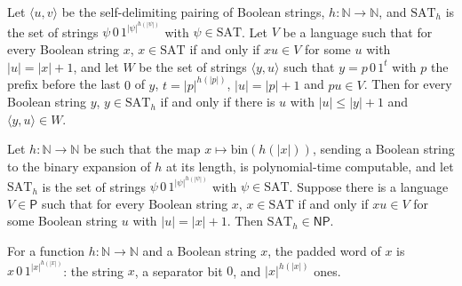 \begin{theorem}
\label{Complexity.ladner_verifier_equiv}
\leanok
{}
Let $\langle u,v\rangle$ be the self-delimiting pairing of Boolean strings, $h:\mathbb N\to\mathbb N$,
and $\mathrm{SAT}_h$ is the set of strings $\psi\,0\,1^{|\psi|^{h(|\psi|)}}$ with $\psi\in\mathrm{SAT}$. Let $V$ be a language such that for every Boolean string $x$, $x\in\mathrm{SAT}$ if and
only if $xu\in V$ for some $u$ with $|u|=|x|+1$, and let $W$ be the set of strings
$\langle y,u\rangle$ such that $y=p\,0\,1^t$ with $p$ the prefix before the last $0$ of $y$,
$t=|p|^{h(|p|)}$, $|u|=|p|+1$ and $pu\in V$. Then for every Boolean string $y$,
$y\in\mathrm{SAT}_h$ if and only if there is $u$ with $|u|\le|y|+1$ and $\langle y,u\rangle\in W$.
\end{theorem}

\begin{theorem}
\label{Complexity.ladner_padded_NP}
\leanok
{}
Let $h:\mathbb N\to\mathbb N$ be such that the map $x\mapsto\mathrm{bin}(h(|x|))$, sending a Boolean
string to the binary expansion of $h$ at its length, is polynomial-time computable, and let
$\mathrm{SAT}_h$ is the set of strings $\psi\,0\,1^{|\psi|^{h(|\psi|)}}$ with $\psi\in\mathrm{SAT}$. Suppose there is a language $V\in\mathsf P$ such that for every Boolean string $x$, $x\in\mathrm{SAT}$ if and only if $xu\in V$ for some Boolean string $u$ with $|u|=|x|+1$. Then $\mathrm{SAT}_h\in\mathsf{NP}$.
\end{theorem}

\begin{definition}
\label{Complexity.ladner_padWord}
\leanok
For a function $h:\mathbb N\to\mathbb N$ and a Boolean string $x$, the padded word of $x$ is
$x\,0\,1^{|x|^{h(|x|)}}$: the string $x$, a separator bit $0$, and $|x|^{h(|x|)}$ ones.
\end{definition}

